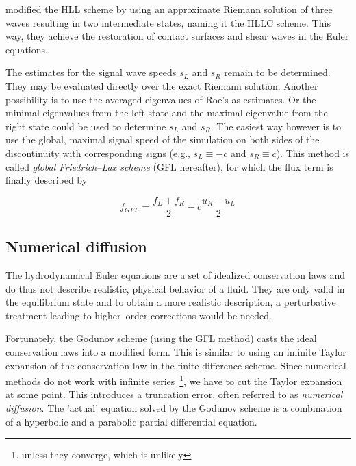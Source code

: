 \citet{HLLC} modified the HLL scheme by using an approximate Riemann solution of three waves resulting in two intermediate states, naming it the HLLC scheme.
This way, they achieve the restoration of contact surfaces and shear waves in the Euler equations.

The estimates for the signal wave speeds $s_{L}$ and $s_{R}$ remain to be determined.
They may be evaluated directly over the exact Riemann solution.
Another possibility is to use the averaged eigenvalues of Roe's as estimates.
Or the minimal eigenvalues from the left state and the maximal eigenvalue from the right state could be used to determine $s_{L}$ and $s_{R}$.
The easiest way however is to use the global, maximal signal speed of the simulation on both sides of the discontinuity with corresponding signs (e.g., $s_{L}\equiv-c$ and $s_{R}\equiv c$).
This method is called \textit{global Friedrich--Lax scheme} (GFL hereafter), for which the flux term is finally described by

\begin{equation}
  f_{GFL} = \frac{f_{L}+f_{R}}{2} - c\frac{u_{R}-u_{L}}{2}
\end{equation}


\subsection{Numerical diffusion}
\label{subsec:Numerical_diffusion}

The hydrodynamical Euler equations are a set of idealized conservation laws and do thus not describe realistic, physical behavior of a fluid.
They are only valid in the equilibrium state and to obtain a more realistic description, a perturbative treatment leading to higher--order corrections would be needed.

Fortunately, the Godunov scheme (using the GFL method) casts the ideal conservation laws into a modified form.
This is similar to using an infinite Taylor expansion of the conservation law in the finite difference scheme.
Since numerical methods do not work with infinite series~\footnote{unless they converge, which is unlikely}, we have to cut the Taylor expansion at some point.
This introduces a truncation error, often referred to as \textit{numerical diffusion}.
The 'actual' equation solved by the Godunov scheme is a combination of a hyperbolic and a parabolic partial differential equation.


